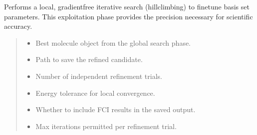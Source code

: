 \documentclass[letterpaper,10pt,english]{sphinxmanual}
\begin{document}
\begin{fulllineitems}
\label{\detokenize{api:MSTOOptpar.AggressiveRefinement}}
\pysigstartsignatures
\pysiglinewithargsret
{}
{\sphinxparamcomma {}\sphinxparamcomma {}\sphinxparamcomma {}\sphinxparamcomma {}\sphinxparamcomma {}}
{}
\pysigstopsignatures
\sphinxAtStartPar
Performs a local, gradient\sphinxhyphen{}free iterative search (hill\sphinxhyphen{}climbing) to fine\sphinxhyphen{}tune 
basis set parameters. This exploitation phase provides the precision 
necessary for scientific accuracy.
\begin{quote}\begin{description}
\begin{itemize}
\item {} 
\sphinxAtStartPar
{} \textendash{} Best molecule object from the global search phase.

\item {} 
\sphinxAtStartPar
{} \textendash{} Path to save the refined candidate.

\item {} 
\sphinxAtStartPar
{} \textendash{} Number of independent refinement trials.

\item {} 
\sphinxAtStartPar
{} \textendash{} Energy tolerance for local convergence.

\item {} 
\sphinxAtStartPar
{} \textendash{} Whether to include FCI results in the saved output.

\item {} 
\sphinxAtStartPar
{} \textendash{} Max iterations permitted per refinement trial.

\end{itemize}

\end{description}\end{quote}


\end{fulllineitems}
\end{document}
